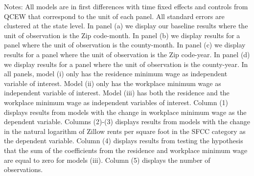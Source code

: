 \begin{table}
    \begin{minipage}{.95\textwidth} \footnotesize
        \vspace{2mm}
        Notes: All models are in first differences with time fixed effects and controls from QCEW that 
        correspond to the unit of each panel. All standard errors are clustered at the state level.
        In panel (a) we display our baseline results where the unit of observation is the Zip code-month.
        In panel (b) we display results for a panel where the unit of observation is the county-month.
        In panel (c) we display results for a panel where the unit of observation is the Zip code-year.
        In panel (d) we display results for a panel where the unit of observation is the county-year.
        In all panels, model (i) only has the residence minimum wage as independent variable of interest. 
        Model (ii) only has the workplace minimum wage as independent variable of interest.
        Model (iii) has both the residence and the workplace minimum wage as independent variables of interest.
        Column (1) displays results from models with the change in workplace minimum wage as the 
        dependent variable.
        Columns (2)-(3) displays results from models with the change in the natural logarithm of Zillow rents 
        per square foot in the SFCC category as the dependent variable. Column (4) displays results from
        testing the hypothesis that the sum of the coefficients from the residence and workplace minimum wage 
        are equal to zero for models (iii). Column (5) displays the number of observations. 

        
        
    \end{minipage}
\end{table}
